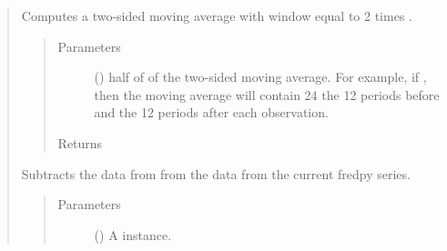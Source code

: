 \documentclass[letterpaper,10pt,openany,oneside,english]{sphinxmanual}
\begin{document}
\begin{fulllineitems}
\begin{quote}
\begin{fulllineitems}
\end{fulllineitems}


\begin{fulllineitems}
\label{\detokenize{series_class:fredpy.series.ma2side}}
Computes a two-sided moving average with window equal to 2 times .
\begin{quote}\begin{description}
\item[{Parameters}] \leavevmode
{} () \textendash{} half of  of the two-sided moving average. For example, if , then the moving average will contain 24 the 12 periods before and the 12 periods after each observation.

\item[{Returns}] \leavevmode
{\hyperref[\detokenize{series_class:fredpy.series}]{}}

\end{description}\end{quote}

\end{fulllineitems}


\begin{fulllineitems}
\label{\detokenize{series_class:fredpy.series.minus}}
Subtracts the data from  from the data from the current fredpy series.
\begin{quote}\begin{description}
\item[{Parameters}] \leavevmode
{} ({\hyperref[\detokenize{series_class:fredpy.series}]{}}) \textendash{} A {\hyperref[\detokenize{series_class:fredpy.series}]{}} instance.


\end{description}
\end{quote}
\end{fulllineitems}
\end{quote}
\end{fulllineitems}
\end{document}
